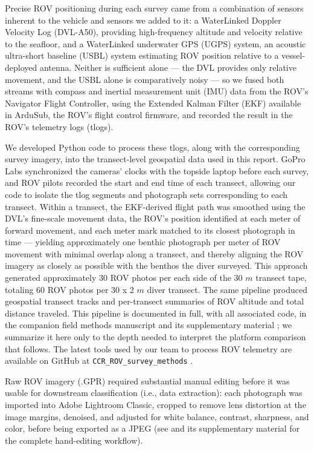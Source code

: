 \documentclass[11pt]{article}
\begin{document}
Precise ROV positioning during each survey came from a combination of sensors
inherent to the vehicle and sensors we added to it: a WaterLinked Doppler
Velocity Log (DVL-A50), providing high-frequency altitude and velocity
relative to the seafloor, and a WaterLinked underwater GPS (UGPS) system, an
acoustic ultra-short baseline (USBL) system estimating ROV position relative
to a vessel-deployed antenna.
Neither is sufficient alone --- the DVL provides only relative movement, and
the USBL alone is comparatively noisy --- so we fused both streams with
compass and inertial measurement unit (IMU) data from the ROV's Navigator
Flight Controller, using the Extended Kalman Filter (EKF) available in ArduSub, the
ROV's flight control firmware, and recorded the result in the ROV's telemetry
logs (tlogs).

We developed Python code to process these tlogs, along with the corresponding
survey imagery, into the transect-level geospatial data used in this report.
GoPro Labs synchronized the cameras' clocks with the topside laptop before
each survey, and ROV pilots recorded the start and end time of each transect,
allowing our code to isolate the tlog segments and photograph sets
corresponding to each transect.
Within a transect, the EKF-derived flight path was smoothed using the DVL's
fine-scale movement data, the ROV's position identified at each meter of
forward movement, and each meter mark matched to its closest photograph in
time --- yielding approximately one benthic photograph per meter of ROV
movement with minimal overlap along a transect, and thereby aligning the ROV
imagery as closely as possible with the benthos the diver surveyed.
This approach generated approximately 30 ROV photos per each side of the 30 $m$ 
transect tape, totaling 60 ROV photos per 30 x 2 $m$ diver transect. 
The same pipeline produced geospatial transect tracks and per-transect
summaries of ROV altitude and total distance traveled.
This pipeline is documented in full, with all associated code, in the
companion field methods manuscript and its supplementary material
\citep{Randell:2026aa}; we summarize it here only to the depth needed to
interpret the platform comparison that follows.
The latest tools used by our team to process ROV telemetry are available on GitHub at \texttt{CCR\_ROV\_survey\_methods} \citep{SeattleAquarium:2026aa}.

Raw ROV imagery (.GPR) required substantial manual editing before it was 
usable for downstream classification (i.e., data extraction): each photograph 
was imported into Adobe Lightroom Classic, cropped to remove lens distortion at 
the image margins, denoised, and adjusted for white balance, contrast, 
sharpness, and color, before being exported as a JPEG (see 
\citealt{Randell:2026aa} and its supplementary material for the complete
hand-editing workflow).
\end{document}
